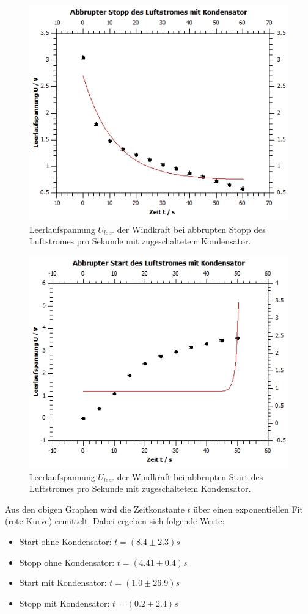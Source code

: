 \documentclass[12pt,a4paper,twoside]{article}
\begin{document}
\begin{figure}[H]
    \centering
    \includegraphics[width=0.6\linewidth]{nudes/wind kondensator stopp.jpg}
    \caption{Leerlaufspannung $U_{leer}$ der Windkraft bei abbrupten Stopp des Luftstromes pro Sekunde mit zugeschaltetem Kondensator.}
    \label{fig:windkraft stopp kondensator diagramm}
\end{figure}


\begin{figure}[H]
    \centering
    \includegraphics[width=0.6\linewidth]{nudes/wind kondensator start.jpg}
    \caption{Leerlaufspannung $U_{leer}$ der Windkraft bei abbrupten Start des Luftstromes pro Sekunde mit zugeschaltetem Kondensator.}
    \label{fig:windkraft start kondensatordiagramm}
\end{figure}

\noindent
Aus den obigen Graphen wird die Zeitkonstante $t$ über einen exponentiellen Fit (rote Kurve) ermittelt. Dabei ergeben sich folgende Werte: 

\begin{itemize}
    \item Start ohne Kondensator: $t = (8.4 \pm 2.3)s$
    \item Stopp ohne Kondensator: $t = (4.41 \pm 0.4)s$
    \item Start mit Kondensator: $t = (1.0 \pm 26.9)s$
    \item Stopp mit Kondensator: $t = (0.2 \pm 2.4)s$
\end{itemize}
\end{document}
